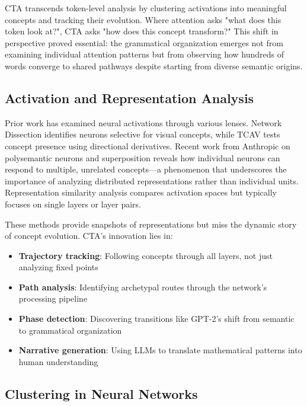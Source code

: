 CTA transcends token-level analysis by clustering activations into meaningful concepts and tracking their evolution. Where attention asks "what does this token look at?", CTA asks "how does this concept transform?" This shift in perspective proved essential: the grammatical organization emerges not from examining individual attention patterns but from observing how hundreds of words converge to shared pathways despite starting from diverse semantic origins.

\subsection{Activation and Representation Analysis}

Prior work has examined neural activations through various lenses. Network Dissection \citep{bau2017} identifies neurons selective for visual concepts, while TCAV \citep{kim2018} tests concept presence using directional derivatives. Recent work from Anthropic on polysemantic neurons and superposition \citep{elhage2022toy, elhage2022superposition} reveals how individual neurons can respond to multiple, unrelated concepts—a phenomenon that underscores the importance of analyzing distributed representations rather than individual units. Representation similarity analysis \citep{kornblith2019, raghu2017} compares activation spaces but typically focuses on single layers or layer pairs.

These methods provide snapshots of representations but miss the dynamic story of concept evolution. CTA's innovation lies in:
\begin{itemize}
    \item \textbf{Trajectory tracking}: Following concepts through all layers, not just analyzing fixed points
    \item \textbf{Path analysis}: Identifying archetypal routes through the network's processing pipeline
    \item \textbf{Phase detection}: Discovering transitions like GPT-2's shift from semantic to grammatical organization
    \item \textbf{Narrative generation}: Using LLMs to translate mathematical patterns into human understanding
\end{itemize}

\subsection{Clustering in Neural Networks}

